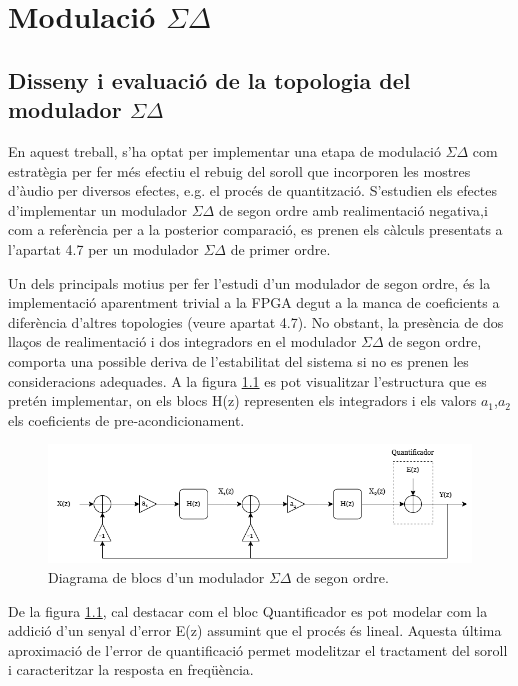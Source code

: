 \chapter{Modulació $\Sigma \Delta$}
\section{Disseny i evaluació de la topologia del modulador $\Sigma\Delta$}
\par En aquest treball, s'ha optat per implementar una etapa de modulació $\Sigma\Delta$ com estratègia per fer més efectiu el rebuig del soroll que incorporen les mostres d'àudio per diversos efectes, e.g. el procés de quantització. S'estudien els efectes d'implementar un modulador $\Sigma\Delta$ de segon ordre amb realimentació negativa,i com a referència per a la posterior comparació, es prenen els càlculs presentats a l'apartat 4.7 per un modulador $\Sigma\Delta$ de primer ordre. 
\par Un dels principals motius per fer l'estudi d'un modulador de segon ordre, és la implementació aparentment trivial a la FPGA degut a la manca de coeficients a diferència d'altres topologies (veure apartat 4.7). No obstant, la presència de dos llaços de realimentació i dos integradors en el modulador $\Sigma\Delta$ de segon ordre, comporta una possible deriva de l'estabilitat del sistema si no es prenen les consideracions adequades. A la figura \ref{fig_SigmaDelta} es pot visualitzar l'estructura que es pretén implementar, on els blocs H(z) representen els integradors i els valors $a_1$,$a_2$ els coeficients de pre-acondicionament.
\begin{figure}[H]
    \centering
    \includegraphics[width=0.7\linewidth]{Images/SigmaDelta.drawio.png}
    \caption{Diagrama de blocs d'un modulador $\Sigma\Delta$ de segon ordre.}
    \label{fig_SigmaDelta}
\end{figure}
\par De la figura \ref{fig_SigmaDelta}, cal destacar com el bloc Quantificador es pot modelar com la addició d'un senyal d'error E(z) assumint que el procés és lineal. Aquesta última aproximació de l'error de quantificació permet modelitzar el tractament del soroll i caracteritzar la resposta en freqüència. 

